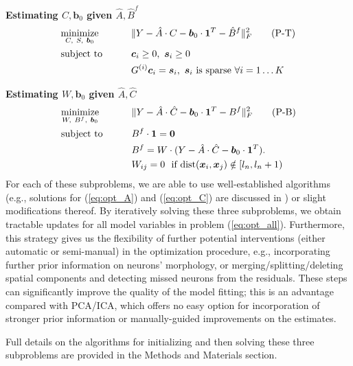 \documentclass[9pt,lineno]{elife}
\begin{document}
\textbf{Estimating $C, \bm{b}_0$ given $\hat{A}, \hat{B}^f$}
\begin{alignat}{2}
&\underset{C,~S, ~ \bm{b}_0}{\text{minimize}} &\qquad& \|Y-\hat{A}\cdot {C} - {\bm{b}}_0\cdot \bm{1}^T- \hat{B}^f\|_F^2 \label{eq:opt_C}\tag{P-T}\\
&\text{subject to} &&\bm{c}_i\geq 0, ~\bm{s}_i\geq 0\notag\\
&&&G^{(i)}\bm{c}_i = \bm{s}_i, ~ \bm{s}_i \text{ is sparse}~ \forall i=1\ldots K\notag
\end{alignat}

\textbf{Estimating $W, {\bm{b}}_0$ given $\hat{A}, \hat{C}$ }
\begin{alignat}{2}
&\underset{W, ~B^f, ~ \bm{b}_0}{\text{minimize}} &\qquad& \|Y-\hat{A}\cdot \hat{C} - \bm{b}_0\cdot \bm{1}^T- B^f\|_F^2 \label{eq:opt_B}\tag{P-B}\\
&\text{subject to} && B^f\cdot \bm{1} = \bm{0}\notag \notag \\
&&&B^f = W\cdot (Y-\hat{A}\cdot \hat{C}-{\bm{b}}_0\cdot \bm{1}^T).\notag \\
&&&W_{ij}=0 ~ \text{ if dist}(\bm{x}_i, \bm{x}_j)\notin [l_n, l_n+1)\notag
\end{alignat}
For each of these subproblems, we are able to use well-established algorithms (e.g., solutions for (\ref{eq:opt_A}) and (\ref{eq:opt_C}) are discussed in \citep{Friedrich2016,Pnevmatikakis2016}) or slight modifications thereof. 
By iteratively solving these three subproblems, we obtain tractable updates for all model variables in problem (\ref{eq:opt_all}). Furthermore, this strategy gives us the flexibility of further potential interventions (either automatic or semi-manual) in the optimization procedure, e.g., incorporating further prior information on neurons' morphology, or merging/splitting/deleting spatial components and detecting missed neurons from the residuals. These steps can significantly improve the quality of the model fitting; this is an advantage compared with  PCA/ICA, which offers no easy option for incorporation of stronger prior information or manually-guided improvements on the estimates. 

Full details on the algorithms for initializing and then solving these three subproblems are provided in the Methods and Materials section. 
\end{document}
